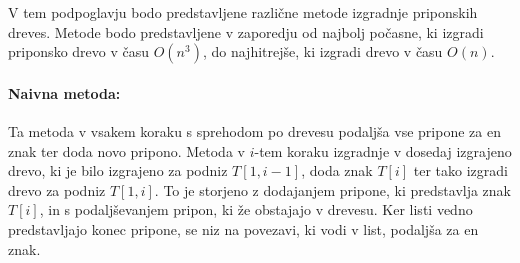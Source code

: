 V tem podpoglavju bodo predstavljene različne metode izgradnje priponskih dreves. Metode bodo predstavljene v zaporedju od najbolj počasne, ki izgradi priponsko drevo v času $O(n^3)$, do najhitrejše, ki izgradi drevo v času $O(n)$. 

\paragraph{Naivna metoda:}
Ta metoda v vsakem koraku s sprehodom po drevesu podaljša vse pripone za en znak ter doda novo pripono. Metoda v $i$-tem koraku izgradnje v dosedaj izgrajeno drevo, ki je bilo izgrajeno za podniz $T[1,i-1]$, doda znak $T[i]$ ter tako izgradi drevo za podniz $T[1,i]$. To je storjeno z dodajanjem pripone, ki predstavlja znak $T[i]$, in s podaljševanjem pripon, ki že obstajajo v drevesu. Ker listi vedno predstavljajo konec pripone, se niz na povezavi, ki vodi v list, podaljša za en znak.


